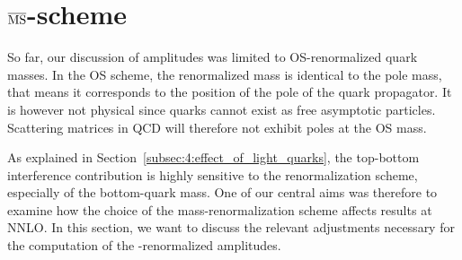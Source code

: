 \section{\texorpdfstring{$\overline{\mathrm{MS}}$}{MS}-scheme}
So far, our discussion of amplitudes was limited to \acs{OS}-renormalized quark masses. In the \acs{OS} scheme, the renormalized mass is identical to the pole mass, that means it corresponds to the position of the pole of the quark propagator. It is however not physical since quarks cannot exist as free asymptotic particles. Scattering matrices in \acs{QCD} will therefore not exhibit poles at the \acs{OS} mass.

As explained in Section~\ref{subsec:4:effect_of_light_quarks}, the top-bottom interference contribution is highly sensitive to the renormalization scheme, especially of the bottom-quark mass. One of our central aims was therefore to examine how the choice of the mass-renormalization scheme affects results at \acs{NNLO}. In this section, we want to discuss the relevant adjustments necessary for the computation of the \MS-renormalized amplitudes.

